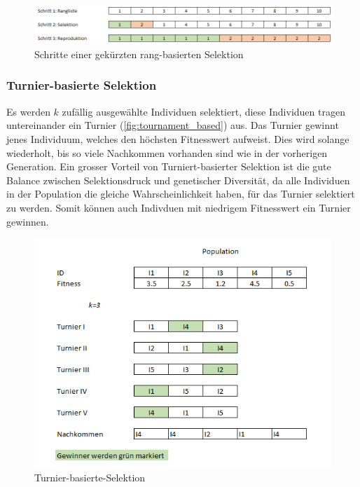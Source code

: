         \begin{figure}[H]
          \includegraphics[scale=0.7, center]{graphics/truncated_rank_based_selection}
          \caption{Schritte einer gekürzten rang-basierten Selektion\label{fig:truncated_rank_based_selection}}
        \end{figure}

      \subsubsection{Turnier-basierte Selektion\label{par:Turnier}}

        Es werden \(k\) zufällig ausgewählte Individuen selektiert, diese Individuen tragen untereinander ein Turnier (\vref{fig:tournament_based}) aus.
        Das Turnier gewinnt jenes Individuum, welches den höchsten Fitnesswert aufweist.
        Dies wird solange wiederholt, bis so viele Nachkommen vorhanden sind wie in der vorherigen Generation.
        Ein grosser Vorteil von Turniert-basierter Selektion ist die gute Balance zwischen
        Selektionsdruck und genetischer Diversität, da alle Individuen in der Population die gleiche Wahrscheinlichkeit haben, für das Turnier selektiert zu werden.
        Somit können auch Indivduen mit niedrigem Fitnesswert ein Turnier gewinnen.

        \begin{figure}[H]
          \includegraphics[scale=1, center]{graphics/tournament_based}
          \caption{Turnier-basierte-Selektion~\label{fig:tournament_based}}
        \end{figure}

